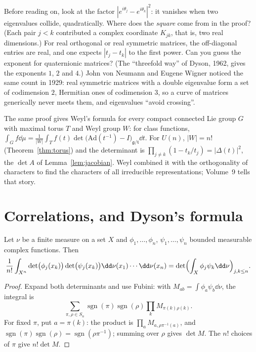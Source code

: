 \begin{think}
Before reading on, look at the factor $|e^{i\theta_j}-e^{i\theta_k}|^2$: it vanishes when two eigenvalues collide, quadratically. Where does the \emph{square} come from in the proof? (Each pair $j<k$ contributed a complex
coordinate $K_{jk}$, that is, two real dimensions.) For real orthogonal or real symmetric matrices, the off-diagonal entries are real, and one expects $|t_j-t_k|$ to the first power. Can you
guess the exponent for quaternionic matrices? (The ``threefold way'' of Dyson, 1962, gives the exponents $1$, $2$ and $4$.) John von Neumann and Eugene Wigner noticed the same count in 1929: real
symmetric matrices with a double eigenvalue form a set of codimension $2$, Hermitian ones of codimension $3$, so a curve of matrices generically never meets them, and eigenvalues ``avoid crossing''.
\end{think}

\begin{remark}
The same proof gives Weyl's formula for every compact connected Lie group $G$ with maximal torus $T$ and Weyl group $W$: for class functions, $\int_Gf\dd\mu=\frac1{|W|}\int_Tf(t)\det\bigl(\mathrm{Ad}(t^{-1})-I\bigr)_{\mathfrak g/\mathfrak t}\dd t$.
For $U(n)$, $|W|=n!$ (Theorem~\ref{thm:torus}) and the determinant is $\prod_{j\neq k}(1-t_k/t_j)=|\Delta(t)|^2$, the $\det A$ of Lemma~\ref{lem:jacobian}. Weyl combined it with the orthogonality of characters to
find the characters of all irreducible representations; Volume~9 tells that story.
\end{remark}

\section{Correlations, and Dyson's formula}

\begin{lemma}[Andreief, 1883]\label{lem:andreief}
Let $\nu$ be a finite measure on a set $X$ and $\phi_1,\dots,\phi_n$, $\psi_1,\dots,\psi_n$ bounded measurable complex functions. Then
\[\frac1{n!}\int_{X^n}\det\bigl(\phi_j(x_k)\bigr)\det\bigl(\psi_j(x_k)\bigr)\dd\nu(x_1)\cdots\dd\nu(x_n)=\det\Bigl(\int_X\phi_j\psi_k\dd\nu\Bigr)_{j,k\le n}.\]
\end{lemma}

\begin{proof}
Expand both determinants and use Fubini: with $M_{ab}=\int\phi_a\psi_b\dd\nu$, the integral is
\[\sum_{\pi,\rho\in S_n}\operatorname{sgn}(\pi)\operatorname{sgn}(\rho)\prod_kM_{\pi(k)\rho(k)}.\] For fixed $\pi$, put $a=\pi(k)$: the product is $\prod_aM_{a,\rho\pi^{-1}(a)}$,
and $\operatorname{sgn}(\pi)\operatorname{sgn}(\rho)=\operatorname{sgn}(\rho\pi^{-1})$; summing over $\rho$ gives $\det M$. The $n!$ choices of $\pi$ give $n!\det M$.
\end{proof}

